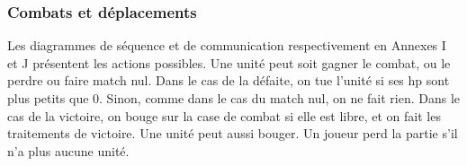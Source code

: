 \subsubsection{Combats et déplacements}
Les diagrammes de séquence et de communication respectivement en Annexes I et J présentent les actions possibles. 
Une unité peut soit gagner le combat, ou le perdre ou faire match nul. Dans le cas de la défaite, on tue l'unité si ses hp sont plus petits que 0. Sinon, comme dans le cas du match nul, on ne fait rien. Dans le cas de la victoire, on bouge sur la case de combat si elle est libre, et on fait les traitements de victoire. Une unité peut aussi bouger. Un joueur perd la partie s'il n'a plus aucune unité.



